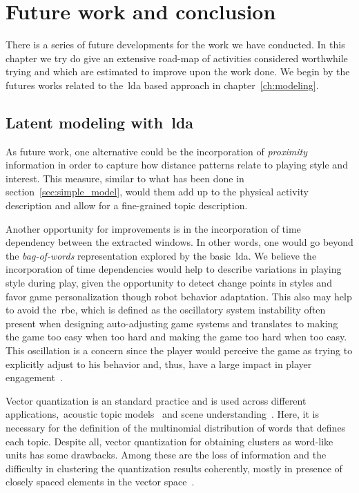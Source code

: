 \chapter{Future work and conclusion}\label{ch:future}

There is a series of future developments for the work we have conducted. In this chapter we try do give an extensive road-map of activities considered worthwhile trying and which are estimated to improve upon the work done. We begin by the futures works related to the~\gls{lda} based approach in chapter~\ref{ch:modeling}.

\section{Latent modeling with~\gls{lda}}
As future work, one alternative could be the incorporation of \textit{proximity} information in order to capture how distance patterns relate to playing style and interest. This measure, similar to what has been done in section~\ref{sec:simple_model}, would them add up to the physical activity description and allow for a fine-grained topic description.

Another opportunity for improvements is in the incorporation of time dependency between the extracted windows. In other words, one would go beyond the \textit{bag-of-words} representation explored by the basic~\gls{lda}. We believe the incorporation of time dependencies would help to describe variations in playing style during play, given the opportunity to detect change points in styles and favor game personalization though robot behavior adaptation. This also may help to avoid the~\gls{rbe}, which is defined as the oscillatory system instability often present when designing auto-adjusting game systems and translates to making the game too easy when too hard and making the game too hard when too easy. This oscillation is a concern since the player would perceive the game as trying to explicitly adjust to his behavior and, thus, have a large impact in player engagement~\citep{martinoia_physically_2013}.

Vector quantization is an standard practice and is used across different applications,~\eg acoustic topic models~\citep{kim_acoustic_2009,kim_audio_2009} and scene understanding~\citep{cao_spatially_2007,li_towards_2009,niu_context_2012}. Here, it is necessary for the definition of the multinomial distribution of words that defines each topic. Despite all, vector quantization for obtaining clusters as word-like units has some drawbacks. Among these are the loss of information and the difficulty in clustering the quantization results coherently, mostly in presence of closely spaced elements in the vector space~\citep{hu_latent_2012}.


